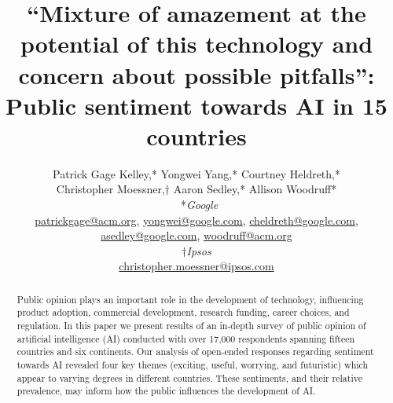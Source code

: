 \documentclass[11pt]{article} %
\begin{document}
\title{``Mixture of amazement at the potential of this technology and concern about possible pitfalls'': Public sentiment towards AI in 15 countries}
\author{
  Patrick Gage Kelley,* Yongwei Yang,* Courtney Heldreth,* \\
  Christopher Moessner,$\dagger$ Aaron Sedley,* Allison Woodruff* \vspace{0.2cm}\\ 
  ~*\textit{Google} \\
        \selectfont\small
        \href{mailto:patrickgage@acm.org}{patrickgage@acm.org},
        \href{mailto:yongwei@google.com}{yongwei@google.com},
        \href{mailto:cheldreth@google.com}{cheldreth@google.com}, \\ 
        \selectfont\small
        \href{mailto:asedley@google.com}{asedley@google.com}, 
        \href{mailto:woodruff@acm.org}{woodruff@acm.org} \vspace{0.2cm}\\
  $\dagger$\textit{Ipsos}\\
        \selectfont\small
        \href{mailto:christopher.moessner@ipsos.com}{christopher.moessner@ipsos.com}}





\maketitle

\begin{abstract}
Public opinion plays an important role in the development of technology, influencing product adoption, commercial development, research funding, career choices, and regulation. In this paper we present results of an in-depth survey of public opinion of artificial intelligence (AI) conducted with over 17,000 respondents spanning fifteen countries and six continents. Our analysis of open-ended responses regarding sentiment towards AI revealed four key themes (exciting, useful, worrying, and futuristic) which appear to varying degrees in different countries. These sentiments, and their relative prevalence, may inform how the public influences the development of AI.

\end{abstract}

\end{document}
